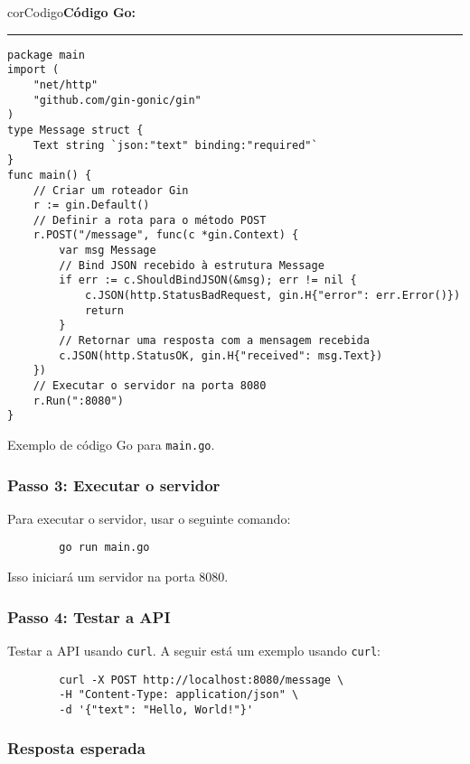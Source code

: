\begin{listing}[!ht]
    \begin{myboxCode}{corCodigo}{\textbf{Código Go: }}\vspace{3mm}
    \hrule
    \begin{verbatim}
package main
import (
    "net/http"
    "github.com/gin-gonic/gin"
)
type Message struct {
    Text string `json:"text" binding:"required"`
}
func main() {
    // Criar um roteador Gin
    r := gin.Default()
    // Definir a rota para o método POST
    r.POST("/message", func(c *gin.Context) {
        var msg Message
        // Bind JSON recebido à estrutura Message
        if err := c.ShouldBindJSON(&msg); err != nil {
            c.JSON(http.StatusBadRequest, gin.H{"error": err.Error()})
            return
        }
        // Retornar uma resposta com a mensagem recebida
        c.JSON(http.StatusOK, gin.H{"received": msg.Text})
    })
    // Executar o servidor na porta 8080
    r.Run(":8080")
}
\end{verbatim}
\end{myboxCode}
\caption{Exemplo de código Go para \texttt{main.go}.}
\label{lst:mainGo}
\end{listing}


\subsubsection{Passo 3: Executar o servidor}

Para executar o servidor, usar o seguinte comando:

\begin{verbatim}
        go run main.go
\end{verbatim}

Isso iniciará um servidor na porta 8080.

\subsubsection{Passo 4: Testar a API}

Testar a API usando \texttt{curl}. A seguir está um exemplo usando \texttt{curl}:

\begin{verbatim}
        curl -X POST http://localhost:8080/message \
        -H "Content-Type: application/json" \
        -d '{"text": "Hello, World!"}'
\end{verbatim}

\subsubsection{Resposta esperada}

